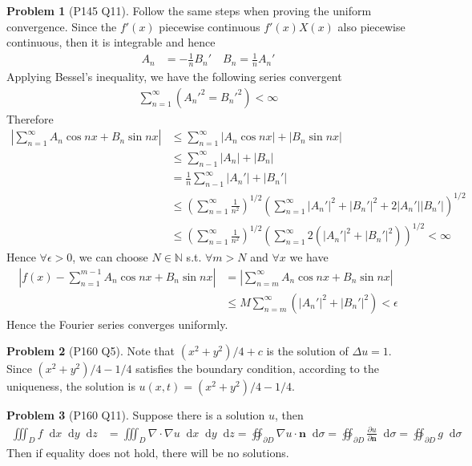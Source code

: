 \documentclass[twoside,11pt]{article}
\newcommand{\N}{\mathbb{N}}
\renewcommand*\d{\mathop{}\!\mathrm{d}}
\theoremstyle{definition}
\newtheorem{problem}{Problem}
\theoremstyle{remark}
\begin{document}
\begin{problem}[P145 Q11]
Follow the same steps when proving the uniform convergence.
Since the $f'(x)$ piecewise continuous $f'(x)X(x)$ also piecewise continuous,
then it is integrable and hence
\begin{align*}
    A_n &= -\frac{1}{n}B_n'\quad B_n = \frac{1}{n}A_n'
\end{align*}
Applying Bessel's inequality, we have the following series convergent
\begin{align*}
    \sum_{n=1}^\infty ({A_n'}^2 = {B_n'}^2) < \infty
\end{align*}
Therefore 
\begin{align*}
    \left|\sum_{n=1}^\infty A_n\cos nx + B_n\sin nx\right|
    &\leq \sum_{n=1}^\infty |A_n\cos nx| + |B_n\sin nx|\\
    &\leq \sum_{n-1}^\infty |A_n| + |B_n|\\
    &= \frac{1}{n}\sum_{n-1}^\infty |A_n'| + |B_n'|\\
    &\leq \left(\sum_{n=1}^\infty \frac{1}{n^2}\right)^{1/2}
    \left(\sum_{n=1}^\infty |A_n'|^2 + |B_n'|^2 + 2|A_n'||B_n'|\right)^{1/2}\\
    &\leq \left(\sum_{n=1}^\infty \frac{1}{n^2}\right)^{1/2}
    \left(\sum_{n=1}^\infty 2(|A_n'|^2 + |B_n'|^2)\right)^{1/2}<\infty
\end{align*}
Hence $\forall \epsilon>0$, we can choose $N\in\N$ s.t. $\forall m > N$
and $\forall x$ we have
\begin{align*}
    \left|f(x) - \sum_{n=1}^{m-1} A_n\cos nx + B_n\sin nx\right|
    &= \left|\sum_{n=m}^\infty A_n\cos nx + B_n\sin nx\right|\\
    &\leq M\sum_{n=m}^\infty (|A_n'|^2 + |B_n'|^2) < \epsilon
\end{align*}
Hence the Fourier series converges uniformly.
\end{problem}



\begin{problem}[P160 Q5]
Note that $(x^2+y^2)/4+c$ is the solution of $\Delta u = 1$.
Since $(x^2+y^2)/4 - 1/4$ satisfies the boundary condition, 
according to the uniqueness, the solution is $u(x, t)=(x^2+y^2)/4 - 1/4$.
\end{problem}



\begin{problem}[P160 Q11]
Suppose there is a solution $u$, then
\begin{align*}
    \iiint_D f\d x\d y\d z &= 
    \iiint_D\nabla\cdot\nabla u\d x\d y\d z
    = \oiint_{\partial D}\nabla u\cdot\mathbf{n}\d \sigma
    = \oiint_{\partial D} \frac{\partial u}{\partial \mathbf{n}}\d \sigma
    = \oiint_{\partial D} g\d \sigma
\end{align*}
Then if equality does not hold, there will be no solutions.
\end{problem}
\end{document}

